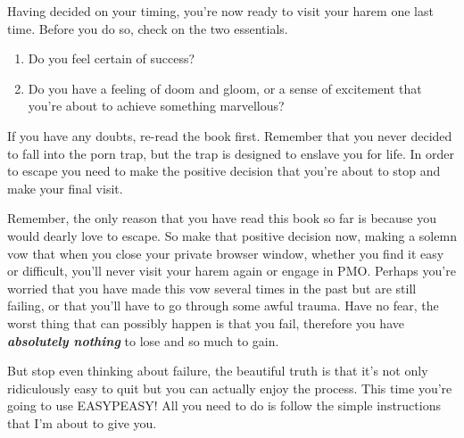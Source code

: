 \documentclass[easypeasy.tex]{subfiles}
\begin{document}
Having decided on your timing, you're now ready to visit your harem one last time. Before you do so, check on the two essentials.
\begin{enumerate}
  \item Do you feel certain of success?
  \item Do you have a feeling of doom and gloom, or a sense of excitement that you're about to achieve something marvellous?
\end{enumerate}

If you have any doubts, re-read the book first. Remember that you never decided to fall into the porn trap, but the trap is designed to enslave you for life. In order to escape you need to make the positive decision that you're about to stop and make your final visit.

Remember, the only reason that you have read this book so far is because you would dearly love to escape. So make that positive decision now, making a solemn vow that when you close your private browser window, whether you find it easy or difficult, you'll never visit your harem again or engage in PMO. Perhaps you're worried that you have made this vow several times in the past but are still failing, or that you'll have to go through some awful trauma. Have no fear, the worst thing that can possibly happen is that you fail, therefore you have \textbf{\textit{absolutely nothing}} to lose and so much to gain.

But stop even thinking about failure, the beautiful truth is that it's not only ridiculously easy to quit but you can actually enjoy the process. This time you're going to use EASYPEASY! All you need to do is follow the simple instructions that I'm about to give you.
\end{document}

